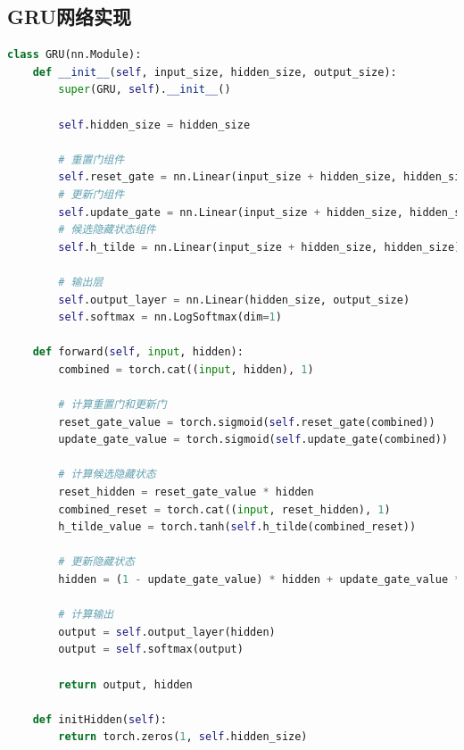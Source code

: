 \documentclass[a4paper]{article}
\begin{document}
\subsection{GRU网络实现}
\begin{lstlisting}[language=Python, caption=GRU网络完整实现]
class GRU(nn.Module):
    def __init__(self, input_size, hidden_size, output_size):
        super(GRU, self).__init__()
        
        self.hidden_size = hidden_size
        
        # 重置门组件
        self.reset_gate = nn.Linear(input_size + hidden_size, hidden_size)
        # 更新门组件
        self.update_gate = nn.Linear(input_size + hidden_size, hidden_size)
        # 候选隐藏状态组件
        self.h_tilde = nn.Linear(input_size + hidden_size, hidden_size)
        
        # 输出层
        self.output_layer = nn.Linear(hidden_size, output_size)
        self.softmax = nn.LogSoftmax(dim=1)
        
    def forward(self, input, hidden):
        combined = torch.cat((input, hidden), 1)
        
        # 计算重置门和更新门
        reset_gate_value = torch.sigmoid(self.reset_gate(combined))
        update_gate_value = torch.sigmoid(self.update_gate(combined))
        
        # 计算候选隐藏状态
        reset_hidden = reset_gate_value * hidden
        combined_reset = torch.cat((input, reset_hidden), 1)
        h_tilde_value = torch.tanh(self.h_tilde(combined_reset))
        
        # 更新隐藏状态
        hidden = (1 - update_gate_value) * hidden + update_gate_value * h_tilde_value
        
        # 计算输出
        output = self.output_layer(hidden)
        output = self.softmax(output)
        
        return output, hidden
        
    def initHidden(self):
        return torch.zeros(1, self.hidden_size)
\end{lstlisting}

\newpage

 
\end{document}
